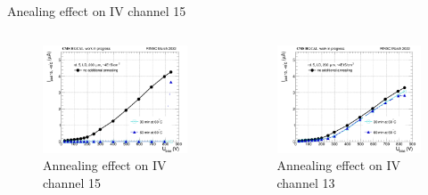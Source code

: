 \documentclass{beamer}
\begin{document}
\begin{frame}{Anealing effect on IV channel 15 }
  \begin{columns}
       \begin{figure}
           \includegraphics[width=1.0\textwidth]{plots/8in_198ch_2019_N4790_09_4E15_neg40degC_annealing_IV_ch15.png}
           \caption{Annealing effect on IV channel 15 }
       \end{figure}
       \begin{figure}
           \includegraphics[width=1.0\textwidth]{plots/8in_198ch_2019_N4790_09_4E15_neg40degC_annealing_IV_ch13.png}
           \caption{Annealing effect on IV channel 13}
       \end{figure}
   \end{columns}
\end{frame}
\end{document}
